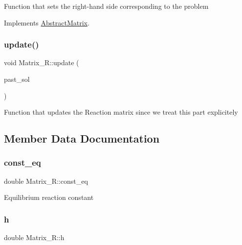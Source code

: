 Function that sets the right-\/hand side corresponding to the problem 

Implements \hyperlink{classAbstractMatrix_a1334661de25f76dc65f16538c167a03c}{Abstract\+Matrix}.

\mbox{\label{classMatrix__R_ab896dfe91327ba364fdcaab15e7f2547}} 
\subsubsection{\texorpdfstring{update()}{update()}}
{\footnotesize\ttfamily void Matrix\+\_\+\+R\+::update (\begin{DoxyParamCaption}\item[{const Eigen\+::\+Vector\+Xd \&}]{past\+\_\+sol }\end{DoxyParamCaption})}

Function that updates the Reaction matrix since we treat this part explicitely 

\subsection{Member Data Documentation}
\mbox{\label{classMatrix__R_ab5ca8aff010e279569065f76d28c4437}} 
\subsubsection{\texorpdfstring{const\+\_\+eq}{const\_eq}}
{\footnotesize\ttfamily double Matrix\+\_\+\+R\+::const\+\_\+eq\hspace{0.3cm}{\ttfamily [private]}}

Equilibrium reaction constant \mbox{\label{classMatrix__R_ac5bb79872f4324d89760f8047a1e63a4}} 
\subsubsection{\texorpdfstring{h}{h}}
{\footnotesize\ttfamily double Matrix\+\_\+\+R\+::h\hspace{0.3cm}{\ttfamily [private]}}


